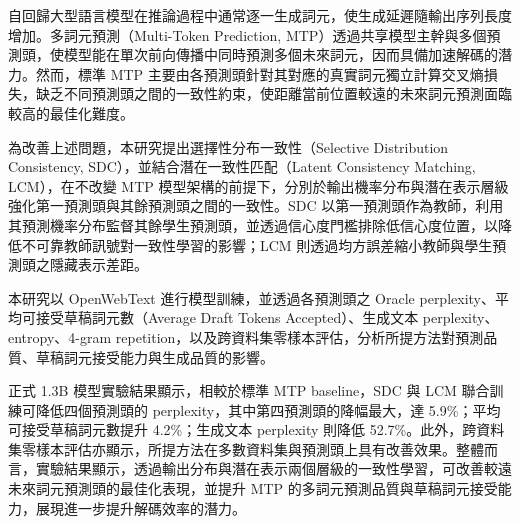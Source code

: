 
\begin{zhAbstract}

    自回歸大型語言模型在推論過程中通常逐一生成詞元，使生成延遲隨輸出序列長度增加。多詞元預測（Multi-Token Prediction, MTP）透過共享模型主幹與多個預測頭，使模型能在單次前向傳播中同時預測多個未來詞元，因而具備加速解碼的潛力。然而，標準 MTP 主要由各預測頭針對其對應的真實詞元獨立計算交叉熵損失，缺乏不同預測頭之間的一致性約束，使距離當前位置較遠的未來詞元預測面臨較高的最佳化難度。

    為改善上述問題，本研究提出選擇性分布一致性（Selective Distribution Consistency, SDC），並結合潛在一致性匹配（Latent Consistency Matching, LCM），在不改變 MTP 模型架構的前提下，分別於輸出機率分布與潛在表示層級強化第一預測頭與其餘預測頭之間的一致性。SDC 以第一預測頭作為教師，利用其預測機率分布監督其餘學生預測頭，並透過信心度門檻排除低信心度位置，以降低不可靠教師訊號對一致性學習的影響；LCM 則透過均方誤差縮小教師與學生預測頭之隱藏表示差距。

    本研究以 OpenWebText 進行模型訓練，並透過各預測頭之 Oracle perplexity、平均可接受草稿詞元數（Average Draft Tokens Accepted）、生成文本 perplexity、entropy、4-gram repetition，以及跨資料集零樣本評估，分析所提方法對預測品質、草稿詞元接受能力與生成品質的影響。

    正式 1.3B 模型實驗結果顯示，相較於標準 MTP baseline，SDC 與 LCM 聯合訓練可降低四個預測頭的 perplexity，其中第四預測頭的降幅最大，達 5.9\%；平均可接受草稿詞元數提升 4.2\%；生成文本 perplexity 則降低 52.7\%。此外，跨資料集零樣本評估亦顯示，所提方法在多數資料集與預測頭上具有改善效果。整體而言，實驗結果顯示，透過輸出分布與潛在表示兩個層級的一致性學習，可改善較遠未來詞元預測頭的最佳化表現，並提升 MTP 的多詞元預測品質與草稿詞元接受能力，展現進一步提升解碼效率的潛力。

    \zhAbsKeywords
\end{zhAbstract}
